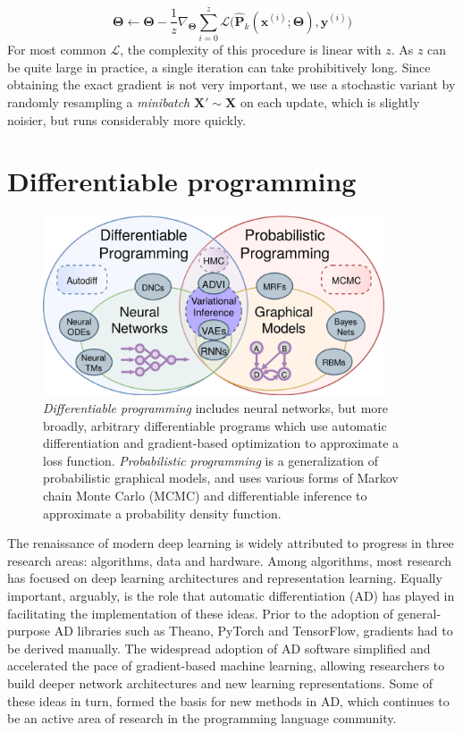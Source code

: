 \documentclass[12pt,initial,twoside,maitrise]{dms}
\numberwithin{equation}{section}
\numberwithin{table}{chapter}
\numberwithin{figure}{chapter}
\begin{document}
%
\begin{equation}
    \boldsymbol\Theta \leftarrow \boldsymbol\Theta - \frac{1}{z}\nabla_{\boldsymbol\Theta} \sum_{i=0}^z\mathcal{L}\big(\mathbf{\hat P}_k(\mathbf{x}^{(i)}; \mathbf{\Theta}), \mathbf{y}^{(i)}\big)
\end{equation}
%
For most common $\mathcal{L}$, the complexity of this procedure is linear with $z$. As $z$ can be quite large in practice, a single iteration can take prohibitively long. Since obtaining the exact gradient is not very important, we use a stochastic variant by randomly resampling a \textit{minibatch} $\mathbf{X}' \sim \mathbf{X}$ on each update, which is slightly noisier, but runs considerably more quickly.

\section{Differentiable programming}\label{sec:differentiable-programming}

\begin{figure}
    \centering
    \includegraphics[width=0.90\textwidth]{diff_prob_prog.png}
    \caption{\textit{Differentiable programming} includes neural networks, but more broadly, arbitrary differentiable programs which use automatic differentiation and gradient-based optimization to approximate a loss function. \textit{Probabilistic programming} is a generalization of probabilistic graphical models, and uses various forms of Markov chain Monte Carlo (MCMC) and differentiable inference to approximate a probability density function.}
    \label{fig:diff_prob_prog}
\end{figure}

The renaissance of modern deep learning is widely attributed to progress in three research areas: algorithms, data and hardware. Among algorithms, most research has focused on deep learning architectures and representation learning. Equally important, arguably, is the role that automatic differentiation (AD) has played in facilitating the implementation of these ideas. Prior to the adoption of general-purpose AD libraries such as Theano, PyTorch and TensorFlow, gradients had to be derived manually. The widespread adoption of AD software simplified and accelerated the pace of gradient-based machine learning, allowing researchers to build deeper network architectures and new learning representations. Some of these ideas in turn, formed the basis for new methods in AD, which continues to be an active area of research in the programming language community.
\end{document}
